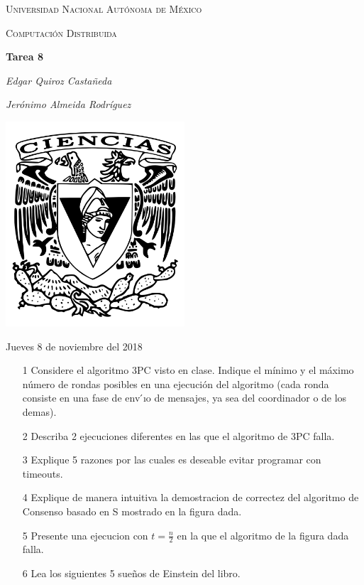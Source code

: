 \documentclass[12pt,a4paper]{report}
\begin{document}
\begin{titlepage}
	\centering
	{\scshape\LARGE Universidad Nacional Autónoma de México \par}
	\vspace{1cm}
	{\scshape\Large Computación Distribuida\par}
	\vspace{1.5cm}
	{\huge\bfseries Tarea 8\par}
	\vspace{.5cm}
	{\Large\itshape Edgar Quiroz Castañeda \par}
	\vspace{.5cm}
	{\Large\itshape Jerónimo Almeida Rodríguez \par}
	\vfill
	 \includegraphics[width=0.5\textwidth]{escudo_f-ciencias.png}
	\vfill

	{\large Jueves 8 de noviembre del 2018 \par}
\end{titlepage}

\pagebreak
\setlength{\voffset}{-0.75in}
\setlength{\headsep}{5pt}

\begin{itemize}
    \item[1]{Considere el algoritmo 3PC visto en clase. Indique el mínimo y el
        máximo número de rondas posibles en una ejecución del algoritmo (cada
        ronda consiste en una fase de env ́ıo de mensajes, ya sea del
        coordinador o de los demas).
    }
    \item[2]{Describa 2 ejecuciones diferentes en las que el algoritmo de 3PC
        falla.
    }
    \item[3]{Explique 5 razones por las cuales es deseable evitar programar con
        timeouts.
    }
    \item[4]{Explique de manera intuitiva la demostracion de correctez del
        algoritmo de Consenso basado en S mostrado en la figura dada.
    }
    \item[5]{Presente una ejecucion con $t=\tfrac{n}{2}$ en la que el algoritmo
        de la figura dada falla.
    }
    \item[6]{Lea los siguientes 5 sueños de Einstein del libro.}
\end{itemize}
\end{document}
